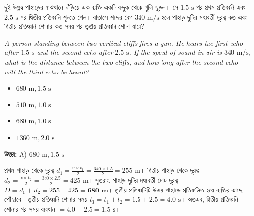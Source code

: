 \documentclass[12pt, a4paper]{article}
\begin{document}
\vspace{2em}

\begin{tcolorbox}[questionbox={প্রশ্ন (Question) 2}]
    \noindent
    দুই উল্লম্ব পাহাড়ের মাঝখানে দাঁড়িয়ে এক ব্যক্তি একটি বন্দুক থেকে গুলি ছুড়ল। সে $1.5\text{ s}$ পর প্রথম প্রতিধ্বনি এবং $2.5\text{ s}$ পর দ্বিতীয় প্রতিধ্বনি শুনতে পেল। বাতাসে শব্দের বেগ $340\text{ m/s}$ হলে পাহাড় দুটির মধ্যবর্তী দূরত্ব কত এবং দ্বিতীয় প্রতিধ্বনি শোনার কত সময় পর তৃতীয় প্রতিধ্বনি শোনা যাবে?
    
    \vspace{0.8em}
    \begin{english}
    \noindent\textit{\color{darkgray}
    A person standing between two vertical cliffs fires a gun. He hears the first echo after $1.5\text{ s}$ and the second echo after $2.5\text{ s}$. If the speed of sound in air is $340\text{ m/s}$, what is the distance between the two cliffs, and how long after the second echo will the third echo be heard?
    }
    \end{english}
\end{tcolorbox}

\begin{itemize}[label={}, leftmargin=1cm, itemsep=0.5em]
    \item[\textbf{A)}] $680\text{ m}, 1.5\text{ s}$
    \item[\textbf{B)}] $510\text{ m}, 1.0\text{ s}$
    \item[\textbf{C)}] $680\text{ m}, 1.0\text{ s}$
    \item[\textbf{D)}] $1360\text{ m}, 2.0\text{ s}$
\end{itemize}

\vspace{0.5em}
\begin{tcolorbox}[answerbox]
    \textbf{\color{success} উত্তর:} A) $680\text{ m}, 1.5\text{ s}$
\end{tcolorbox}
\vspace{1em}

\begin{tcolorbox}[solutionbox={সমাধান (Solution)}]
    \noindent
    প্রথম পাহাড় থেকে দূরত্ব $d_1 = \frac{v \times t_1}{2} = \frac{340 \times 1.5}{2} = 255\text{ m}$। দ্বিতীয় পাহাড় থেকে দূরত্ব $d_2 = \frac{v \times t_2}{2} = \frac{340 \times 2.5}{2} = 425\text{ m}$। সুতরাং, পাহাড় দুটির মধ্যবর্তী মোট দূরত্ব $D = d_1 + d_2 = 255 + 425 = \mathbf{680\text{ m}}$। তৃতীয় প্রতিধ্বনিটি উভয় পাহাড়ে প্রতিফলিত হয়ে ব্যক্তির কাছে পৌঁছাবে। তৃতীয় প্রতিধ্বনি শোনার সময় $t_3 = t_1 + t_2 = 1.5 + 2.5 = 4.0\text{ s}$। অতএব, দ্বিতীয় প্রতিধ্বনি শোনার পর সময় ব্যবধান $= 4.0 - 2.5 = \mathbf{1.5\text{ s}}$।
\end{tcolorbox}
\end{document}
